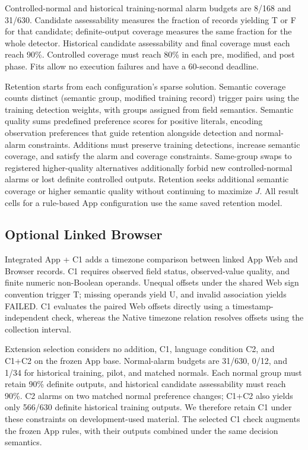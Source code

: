 Controlled-normal and historical training-normal alarm budgets are 8/168 and 31/630. Candidate assessability measures the fraction of records yielding T or F for that candidate; definite-output coverage measures the same fraction for the whole detector. Historical candidate assessability and final coverage must each reach 90\%. Controlled coverage must reach 80\% in each pre, modified, and post phase. Fits allow no execution failures and have a 60-second deadline.

Retention starts from each configuration's sparse solution. Semantic coverage counts distinct (semantic group, modified training record) trigger pairs using the training detection weights, with groups assigned from field semantics. Semantic quality sums predefined preference scores for positive literals, encoding observation preferences that guide retention alongside detection and normal-alarm constraints. Additions must preserve training detections, increase semantic coverage, and satisfy the alarm and coverage constraints. Same-group swaps to registered higher-quality alternatives additionally forbid new controlled-normal alarms or lost definite controlled outputs. Retention seeks additional semantic coverage or higher semantic quality without continuing to maximize \(J\). All result cells for a rule-based App configuration use the same saved retention model.

\hypertarget{sec:3-5}{%
\subsection{Optional Linked Browser}\label{sec:3-5}}

Integrated App + C1 adds a timezone comparison between linked App Web and Browser records. C1 requires observed field status, observed-value quality, and finite numeric non-Boolean operands. Unequal offsets under the shared Web sign convention trigger T; missing operands yield U, and invalid association yields FAILED. C1 evaluates the paired Web offsets directly using a timestamp-independent check, whereas the Native timezone relation resolves offsets using the collection interval.

Extension selection considers no addition, C1, language condition C2, and C1+C2 on the frozen App base. Normal-alarm budgets are 31/630, 0/12, and 1/34 for historical training, pilot, and matched normals. Each normal group must retain 90\% definite outputs, and historical candidate assessability must reach 90\%. C2 alarms on two matched normal preference changes; C1+C2 also yields only 566/630 definite historical training outputs. We therefore retain C1 under these constraints on development-used material. The selected C1 check augments the frozen App rules, with their outputs combined under the same decision semantics.
